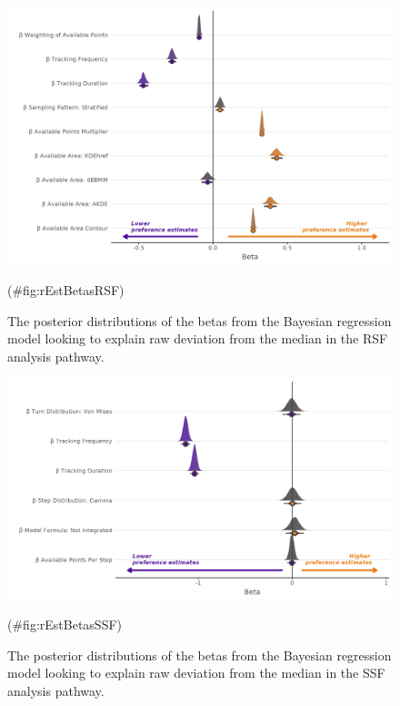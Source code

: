 \documentclass[10pt,a4paper]{article}
\begin{document}
\begin{figure}
\includegraphics[width=1\linewidth]{../figures/rsf_rEstRSF_effectsPlot} \caption{The posterior distributions of the betas from the Bayesian regression model looking to explain raw deviation from the median in the RSF analysis pathway.}(\#fig:rEstBetasRSF)
\end{figure}

\begin{figure}
\includegraphics[width=1\linewidth]{../figures/ssf_rEstSSF_effectsPlot} \caption{The posterior distributions of the betas from the Bayesian regression model looking to explain raw deviation from the median in the SSF analysis pathway.}(\#fig:rEstBetasSSF)
\end{figure}
\end{document}
